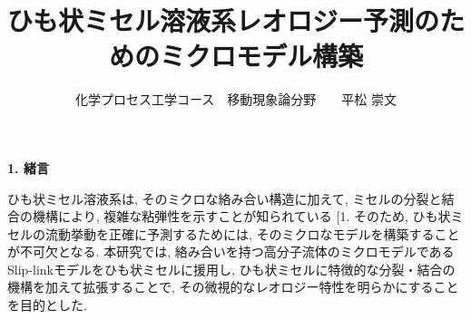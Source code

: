 \documentclass[twocolumns,10pt,a4j]{jarticle}
\title{\Large ひも状ミセル溶液系レオロジー予測のためのミクロモデル構築\vspace{-3truemm}}
\author{\large 化学プロセス工学コース　移動現象論分野　　平松 崇文\vspace{-10zh}}
\date{}
\makeatletter
\DeclareRobustCommand\cite{\unskip
  \@ifnextchar[{\@tempswatrue\@citex}{\@tempswafalse\@citex[]}}
\makeatother
\begin{document}
      \noindent		
      {\bf \large 1. 緒言}
      \par ひも状ミセル溶液系は, そのミクロな絡み合い構造に加えて, ミセルの分裂と結合の機構により, 複雑な粘弾性を示すことが知られている\cite{1}. そのため, ひも状ミセルの流動挙動を正確に予測するためには, そのミクロなモデルを構築することが不可欠となる. 本研究では, 絡み合いを持つ高分子流体のミクロモデルであるSlip-linkモデルをひも状ミセルに援用し, ひも状ミセルに特徴的な分裂・結合の機構を加えて拡張することで, その微視的なレオロジー特性を明らかにすることを目的とした. 
\end{document}
